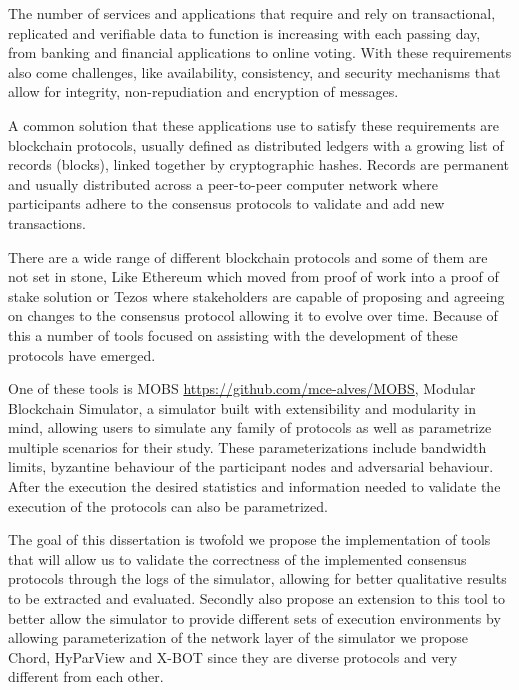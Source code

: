 
%

The number of services and applications that require and rely on transactional, replicated and verifiable data to 
function is increasing with each passing day, from banking and financial applications to online voting. With these
requirements also come challenges, like availability, consistency, and security mechanisms that allow for integrity, non-repudiation and
encryption of messages.

A common solution that these applications use to satisfy these requirements are blockchain protocols, usually defined as
distributed ledgers with a growing list of records (blocks), linked together by cryptographic hashes. Records are permanent and
usually distributed across a peer-to-peer computer network where participants adhere to the consensus protocols to validate and add
new transactions.

There are a wide range of different blockchain protocols and some of them are not set in stone, Like Ethereum which moved from proof of work
into a proof of stake solution or Tezos where stakeholders are capable of proposing and agreeing on changes to the consensus protocol allowing
it to evolve over time. Because of this a number of tools focused on assisting with the development of these protocols have emerged.

One of these tools is MOBS \url{https://github.com/mce-alves/MOBS}, Modular Blockchain Simulator, a simulator built with extensibility and
modularity in mind, allowing users to simulate any family of protocols as well as parametrize multiple scenarios for their study.
These parameterizations include bandwidth limits, byzantine behaviour of the participant nodes and adversarial behaviour. After the execution
the desired statistics and information needed to validate the execution of the protocols can also be parametrized.

The goal of this dissertation is twofold we propose the implementation of tools that will allow us to validate the correctness 
of the implemented consensus protocols through the logs of the simulator, allowing for better qualitative results to be extracted and evaluated.
Secondly also propose an extension to this tool to better allow the simulator to provide different sets of execution environments by
allowing parameterization of the network layer of the simulator we propose Chord, HyParView and X-BOT since they are diverse protocols and very different from each other.


